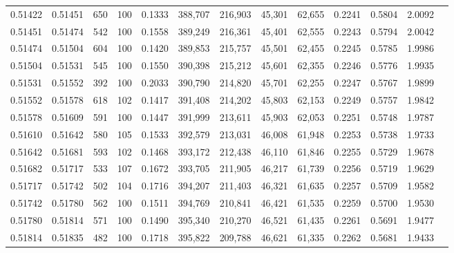 \begin{tabular}{rrrrrrrrrrrrr}
0.51422 & 0.51451 &   650 & 100 &                                     0.1333 & 388,707 & 216,903 &  45,301 &  62,655 & 0.2241 & 0.5804 & 2.0092 \\
0.51451 & 0.51474 &   542 & 100 &                                     0.1558 & 389,249 & 216,361 &  45,401 &  62,555 & 0.2243 & 0.5794 & 2.0042 \\
0.51474 & 0.51504 &   604 & 100 &                                     0.1420 & 389,853 & 215,757 &  45,501 &  62,455 & 0.2245 & 0.5785 & 1.9986 \\
0.51504 & 0.51531 &   545 & 100 &                                     0.1550 & 390,398 & 215,212 &  45,601 &  62,355 & 0.2246 & 0.5776 & 1.9935 \\
0.51531 & 0.51552 &   392 & 100 &                                     0.2033 & 390,790 & 214,820 &  45,701 &  62,255 & 0.2247 & 0.5767 & 1.9899 \\
0.51552 & 0.51578 &   618 & 102 &                                     0.1417 & 391,408 & 214,202 &  45,803 &  62,153 & 0.2249 & 0.5757 & 1.9842 \\
0.51578 & 0.51609 &   591 & 100 &                                     0.1447 & 391,999 & 213,611 &  45,903 &  62,053 & 0.2251 & 0.5748 & 1.9787 \\
0.51610 & 0.51642 &   580 & 105 &                                     0.1533 & 392,579 & 213,031 &  46,008 &  61,948 & 0.2253 & 0.5738 & 1.9733 \\
0.51642 & 0.51681 &   593 & 102 &                                     0.1468 & 393,172 & 212,438 &  46,110 &  61,846 & 0.2255 & 0.5729 & 1.9678 \\
0.51682 & 0.51717 &   533 & 107 &                                     0.1672 & 393,705 & 211,905 &  46,217 &  61,739 & 0.2256 & 0.5719 & 1.9629 \\
0.51717 & 0.51742 &   502 & 104 &                                     0.1716 & 394,207 & 211,403 &  46,321 &  61,635 & 0.2257 & 0.5709 & 1.9582 \\
0.51742 & 0.51780 &   562 & 100 &                                     0.1511 & 394,769 & 210,841 &  46,421 &  61,535 & 0.2259 & 0.5700 & 1.9530 \\
0.51780 & 0.51814 &   571 & 100 &                                     0.1490 & 395,340 & 210,270 &  46,521 &  61,435 & 0.2261 & 0.5691 & 1.9477 \\
0.51814 & 0.51835 &   482 & 100 &                                     0.1718 & 395,822 & 209,788 &  46,621 &  61,335 & 0.2262 & 0.5681 & 1.9433 \\

\end{tabular}

